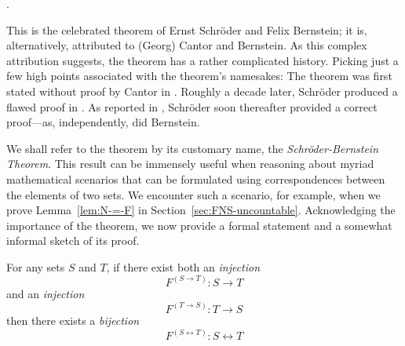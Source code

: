 \hspace*{.2in}{\em a bijection between $S$ and $T$}.


\noindent
This is the celebrated theorem of Ernst Schr\"{o}der and Felix Bernstein; it is, alternatively, attributed to (Georg) Cantor and Bernstein.  As this complex attribution suggests, the theorem has a rather complicated history.  Picking just a few high points associated with the theorem's namesakes: The theorem was first stated without proof by Cantor in \cite{Cantor87}.  Roughly a decade later, Schr\"{o}der produced a flawed proof in \cite{Schroeder98a}.  As reported in \cite{Deiser2010}, Schr\"{o}der soon thereafter provided a correct proof---as, independently, did Bernstein.

We shall refer to the theorem by its customary name, the {\it Schr\"{o}der-Bernstein Theorem}. This result can be immensely useful when reasoning about myriad mathematical scenarios that can be formulated using correspondences between the elements of two sets.  We encounter such a scenario, for example, when we prove Lemma~\ref{lem:N-=-F} in Section~\ref{sec:FNS-uncountable}.  Acknowledging the importance of the theorem, we now provide a formal statement and a somewhat informal sketch of its proof.

\begin{theorem}
\label{thm.S-B}
For any sets $S$ and $T$, if there exist both an {\em injection}
\[ F^{(S \rightarrow T)}: S \rightarrow T \]
and an {\em injection}
\[ F^{(T \rightarrow S)}: T \rightarrow S \]
then there exists a {\em bijection}
\[ F^{(S \leftrightarrow T)}: S \leftrightarrow T \]
\end{theorem}

